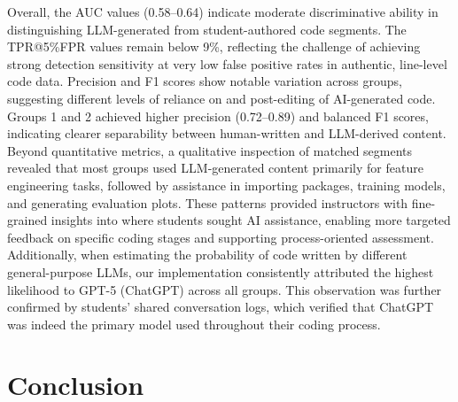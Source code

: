 \documentclass[runningheads]{llncs}
\begin{document}
Overall, the AUC values (0.58–0.64) indicate moderate discriminative ability in distinguishing LLM-generated from student-authored code segments. The TPR@5\%FPR values remain below 9\%, reflecting the challenge of achieving strong detection sensitivity at very low false positive rates in authentic, line-level code data. Precision and F1 scores show notable variation across groups, suggesting different levels of reliance on and post-editing of AI-generated code. Groups 1 and 2 achieved higher precision (0.72–0.89) and balanced F1 scores, indicating clearer separability between human-written and LLM-derived content. Beyond quantitative metrics, a qualitative inspection of matched segments revealed that most groups used LLM-generated content primarily for feature engineering tasks, followed by assistance in importing packages, training models, and generating evaluation plots. These patterns provided instructors with fine-grained insights into where students sought AI assistance, enabling more targeted feedback on specific coding stages and supporting process-oriented assessment. Additionally, when estimating the probability of code written by different general-purpose LLMs, our implementation consistently attributed the highest likelihood to GPT-5 (ChatGPT) across all groups. This observation was further confirmed by students’ shared conversation logs, which verified that ChatGPT was indeed the primary model used throughout their coding process. 



\section{Conclusion}
\end{document}

